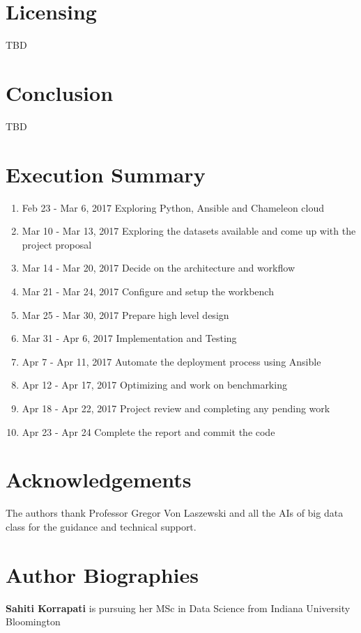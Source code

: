 \documentclass[9pt,twocolumn,twoside]{../../styles/osajnl}
\begin{document}
\section{Licensing}
TBD

\section{Conclusion}
TBD

\section{Execution Summary}
\begin{enumerate}
    \item{Feb 23 - Mar 6, 2017} Exploring Python, Ansible and Chameleon cloud
    \item{Mar 10 - Mar 13, 2017} Exploring the datasets available and come up with the project proposal
    \item{Mar 14 - Mar 20, 2017} Decide on the architecture and workflow
    \item{Mar 21 - Mar 24, 2017} Configure and setup the workbench
    \item{Mar 25 - Mar 30, 2017} Prepare high level design
    \item{Mar 31 - Apr 6, 2017} Implementation and Testing
    \item{Apr 7 - Apr 11, 2017} Automate the deployment process using Ansible
    \item{Apr 12 - Apr 17, 2017} Optimizing and work on benchmarking
    \item{Apr 18 - Apr 22, 2017} Project review and completing any pending work
    \item{Apr 23 - Apr 24} Complete the report and commit the code
\end{enumerate}

\section*{Acknowledgements}

The authors thank Professor Gregor Von Laszewski and all the AIs of big data class for the guidance and technical support.


 
\section*{Author Biographies}
\begingroup
\setlength\intextsep{0pt}
\begin{minipage}[t][3.2cm][t]{1.0\columnwidth} %
  \noindent
  {\bfseries Sahiti Korrapati} is pursuing her MSc in Data Science from
  Indiana University Bloomington
\end{minipage}
\endgroup
\end{document}
